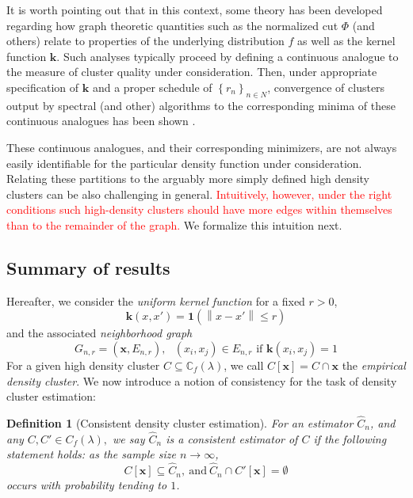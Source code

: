 \documentclass{article}
\newcommand{\set}[1]{\left\{#1\right\}}
\newcommand{\norm}[1]{\left\lVert#1\right\rVert}
\newcommand{\x}{\mathbf{x}}
\newcommand{\1}{\mathbf{1}}
\theoremstyle{aldenthm}
\newtheorem{definition}{Definition}
\theoremstyle{remark}
\begin{document}
It is worth pointing out that in this context, some theory has been developed regarding how graph theoretic quantities such as the normalized cut $\Phi$ (and others) relate to properties of the underlying distribution $f$ as well as the kernel function $\mathbf{k}$. Such analyses typically proceed by defining a continuous analogue to the measure of cluster quality under consideration. Then, under appropriate specification of $\mathbf{k}$ and a proper schedule of $\set{r_n}_{n \in N}$, convergence of clusters output by spectral (and other) algorithms to the corresponding minima of these continuous analogues has been shown \cite{vonluxburg2008, garciatrillos18}.

These continuous analogues, and their corresponding minimizers, are not always easily identifiable for the particular density function under consideration. Relating these partitions to the arguably more simply defined high density clusters can be also challenging in general. \textcolor{red}{Intuitively, however, under the right conditions such high-density clusters should have more edges within themselves than to the remainder of the graph.} We formalize this intuition next.

\subsection{Summary of results}

Hereafter, we consider the \textit{uniform kernel function} for a fixed $r > 0$,
\begin{equation}
\mathbf{k}(x,x') = \1(\norm{x - x'} \leq r)
\end{equation}
and the associated \textit{neighborhood graph} 
\begin{equation}
G_{n,r} = (\x, E_{n,r}), \text{  $(x_i,x_j) \in E_{n,r}$ if $\mathbf{k}(x_i,x_j) = 1$}
\end{equation}
For a given high density cluster $C \subseteq \mathbb{C}_f(\lambda)$, we call $C[\x] = C \cap \x$ the \textit{empirical density cluster}. We now introduce a notion of consistency for the task of density cluster estimation:

\begin{definition}[Consistent density cluster estimation]
	For an estimator $\widehat{C}_n$, and any $C, C' \in C_f(\lambda),$ we say $\widehat{C}_n$ is a consistent estimator of $C$ if the following statement holds: as the sample size $n \to \infty$,
	\begin{equation}
	C[\x] \subseteq \widehat{C}_n, ~\mathrm{ and }~ \widehat{C}_n \cap C'[\x] = \emptyset
	\end{equation}
	occurs with probability tending to $1$.
	
\end{definition}
\end{document}
